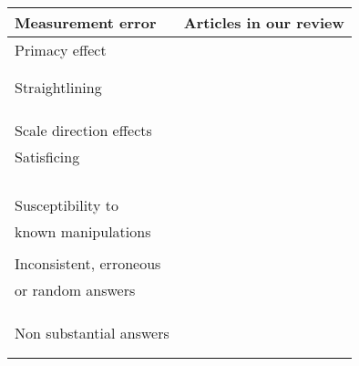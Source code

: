 \begin{table}
	\centering
	\begin{tabular}{ll}
		\toprule
		Measurement error & Articles in our review\\
		\midrule
		Primacy effect & \cite{erens_comparing_2019, wells_comparison_2014}\\
    	& \cite{mavletova_data_2013, lugtig_use_2016}\\
    	& \cite{tourangeau_web_2017, toepoel_what_2014}\\
    	Straightlining & \cite{erens_comparing_2019, mavletova_grid_2018}\\
    	& \cite{lugtig_recruiting_2019, struminskaya_effects_2015}\\
    	& \cite{lugtig_use_2016, tourangeau_web_2018}\\
    	& \cite{keusch_web_2017}\\
    	Scale direction effects & \cite{krebs_exploring_2021, tourangeau_web_2018}\\
    	Satisficing & \cite{revilla_experiment_2017, erens_comparing_2019}\\
    	& \cite{revilla_comparing_2018, mavletova_data_2013}\\
    	& \cite{daikeler_motivated_2020, lugtig_recruiting_2019}\\
    	& \cite{toepoel_sliders_2018, struminskaya_effects_2015}\\
    	& \cite{lugtig_use_2016, keusch_web_2017}\\
    	Susceptibility to  & \cite{wells_comparison_2014, hartman_does_2019}\\
    	known manipulations & \cite{peytchev_experiments_2010, tourangeau_web_2017}\\
    	& \cite{keusch_web_2017}\\
    	Inconsistent, erroneous & \cite{revilla_comparing_2018, weigold_computerized_2021}\\
    	or random answers & \cite{hartman_does_2019}\\
    	& \cite{ bosch_measurement_2019}\\
    	& \cite{antoun_simultaneous_2019, skeie_smartphone_2019}\\
    	& \cite{revilla_testing_2018, huff_comparison_2015}\\
        Non substantial answers & \cite{revilla_comparing_2018, mavletova_data_2013}\\
    	& \cite{antoun_effects_2017, schlosser_mobile_2018}\\
    	& \cite{revilla_open_2016, toepoel_sliders_2018}\\

\end{tabular}
\end{table}

